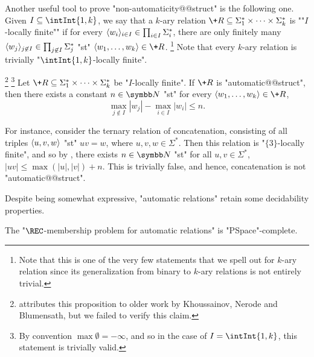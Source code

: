 Another useful tool to prove "non-automaticity@@struct" is the following one.
Given $I \subseteq \intInt{1,k}$,
we say that a $k$-ary relation $\+R \subseteq \Sigma_1^* \times \cdots \times \Sigma_k^*$ is
""$I$-locally finite"" if for every $\langle w_i\rangle_{i\in I} \in \prod_{i\in I} \Sigma_i^*$,
there are only finitely many $\langle w_j\rangle_{j\not\in I} \in \prod_{j \not\in I} \Sigma_j^*$
"st" $\tup{w_1,\dotsc,w_k} \in \+R$.%
\footnote{Note that this is one of the very few statements
that we spell out for $k$-ary relation since its generalization from binary to $k$-ary relations
is not entirely trivial.}
Note that every $k$-ary relation is trivially "$\intInt{1,k}$-locally finite".
\begin{proposition}
	\label{prop:non-synchronous}
	\!\footnote{\cite{KhoussainovNiesRubinStephan2007Automatic} attributes this proposition
	to older work by Khoussainov, Nerode and Blumensath, but we failed to verify this claim.}%
	\footnote{By convention $\max{\emptyset} = -\infty$, and so in the case
	of $I = \intInt{1,k}$, this statement is trivially valid.}
	\AP\label{prop:bound-automatic-structures}
	Let $\+R \subseteq \Sigma_1^* \times \cdots \times \Sigma_k^*$ be "$I$-locally finite".
	If $\+R$ is "automatic@@struct", then there exists a constant $n\in\N$ "st" for every
	$\tup{w_1,\dotsc,w_k} \in \+R$,
	\[
		\max_{j \not\in I}{|w_j|} - \max_{i \in I}{|w_i|} \leq n.
	\]
\end{proposition}

For instance, consider the ternary relation of concatenation,
consisting of all triples $\langle u,v,w\rangle$ "st" $uv = w$, where $u,v,w\in\Sigma^*$.
Then this relation is "$\{3\}$-locally finite", and so by
, there exists $n\in \N$
"st" for all $u,v \in \Sigma^*$, $|uv| \leq \max{(|u|,|v|)} + n$.
This is trivially false, and hence, concatenation is not "automatic@@struct".

Despite being somewhat expressive, "automatic relations" retain some decidability properties. 
\begin{proposition}
	\!
	The "$\REC$-membership problem for automatic relations" is "PSpace"-complete.
\end{proposition}

